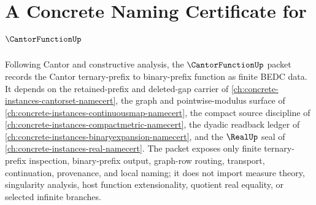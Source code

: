 \chapter{A Concrete Naming Certificate for $\CantorFunctionUp$}
\label{ch:concrete-instances-cantor-function-namecert}

Following Cantor and constructive analysis, the $\CantorFunctionUp$ packet records the Cantor ternary-prefix to binary-prefix function as finite BEDC data. It depends on the retained-prefix and deleted-gap carrier of \autoref{ch:concrete-instances-cantorset-namecert}, the graph and pointwise-modulus surface of \autoref{ch:concrete-instances-continuousmap-namecert}, the compact source discipline of \autoref{ch:concrete-instances-compactmetric-namecert}, the dyadic readback ledger of \autoref{ch:concrete-instances-binaryexpansion-namecert}, and the $\RealUp$ seal of \autoref{ch:concrete-instances-real-namecert}. The packet exposes only finite ternary-prefix inspection, binary-prefix output, graph-row routing, transport, continuation, provenance, and local naming; it does not import measure theory, singularity analysis, host function extensionality, quotient real equality, or selected infinite branches.

